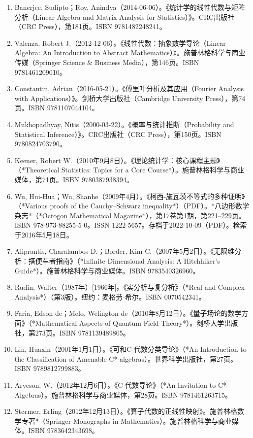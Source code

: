 \begin{enumerate}
\item Banerjee, Sudipto；Roy, Anindya（2014-06-06）。《统计学的线性代数与矩阵分析（Linear Algebra and Matrix Analysis for Statistics）》。CRC出版社（CRC Press），第181页。ISBN 9781482248241。
\item Valenza, Robert J.（2012-12-06）。《线性代数：抽象数学导论（Linear Algebra: An Introduction to Abstract Mathematics）》。施普林格科学与商业传媒（Springer Science & Business Media），第146页。ISBN 9781461209010。
\item Constantin, Adrian（2016-05-21）。《傅里叶分析及其应用（Fourier Analysis with Applications）》。剑桥大学出版社（Cambridge University Press），第74页。ISBN 9781107044104。
\item Mukhopadhyay, Nitis（2000-03-22）。《概率与统计推断（Probability and Statistical Inference）》。CRC出版社（CRC Press），第150页。ISBN 9780824703790。
\item Keener, Robert W.（2010年9月8日）。《理论统计学：核心课程主题》（*Theoretical Statistics: Topics for a Core Course*）。施普林格科学与商业媒体，第71页。ISBN 9780387938394。
\item Wu, Hui-Hua；Wu, Shanhe（2009年4月）。《柯西-施瓦茨不等式的多种证明》（*Various proofs of the Cauchy–Schwarz inequality*）（PDF）。*八边形数学杂志*（*Octogon Mathematical Magazine*），第17卷第1期，第221–229页。ISBN 978-973-88255-5-0。ISSN 1222-5657。存档于2022-10-09（PDF）。检索于2016年5月18日。
\item Aliprantis, Charalambos D.；Border, Kim C.（2007年5月2日）。《无限维分析：搭便车者指南》（*Infinite Dimensional Analysis: A Hitchhiker's Guide*）。施普林格科学与商业媒体。ISBN 9783540326960。
\item Rudin, Walter（1987年）[1966年]。《实分析与复分析》（*Real and Complex Analysis*）（第3版）。纽约：麦格劳-希尔。ISBN 0070542341。
\item Faria, Edson de；Melo, Welington de（2010年8月12日）。《量子场论的数学方面》（*Mathematical Aspects of Quantum Field Theory*）。剑桥大学出版社，第273页。ISBN 9781139489805。
\item Lin, Huaxin（2001年1月1日）。《可和C\*-代数分类导论》（*An Introduction to the Classification of Amenable C*-algebras\*）。世界科学出版社，第27页。ISBN 9789812799883。
\item Arveson, W.（2012年12月6日）。《C\*-代数导论》（*An Invitation to C*-Algebras\*）。施普林格科学与商业媒体，第28页。ISBN 9781461263715。
\item Størmer, Erling（2012年12月13日）。《算子代数的正线性映射》。施普林格数学专著*（Springer Monographs in Mathematics）。施普林格科学与商业媒体。ISBN 9783642343698。

\end{enumerate}
